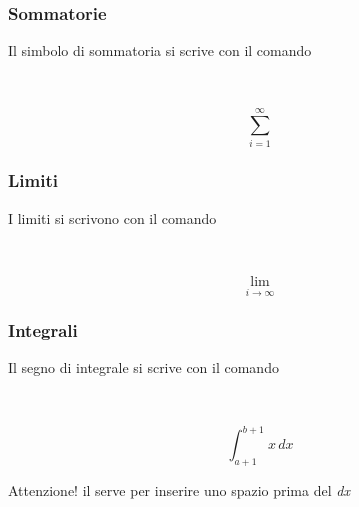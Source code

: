 \documentclass[svgnames,%
	ucs,%
	pdftex]{guitbeamer}
\begin{document}
\begin{frame}
  \frametitle{Sommatorie}
	Il simbolo di sommatoria si scrive con il comando 
 	\begin{LaTeXcode}
		\\[\n
		\hspace*{5ex}\alert{\\sum}\_\{i=1\}\textasciicircum \{\\infty\}\n
		\\]
 	\end{LaTeXcode}
	\begin{LaTeXoutput}
		\[
			\sum_{i=1}^{\infty}
		\]
	\end{LaTeXoutput}
\end{frame}
\begin{frame}
  \frametitle{Limiti}
	I limiti si scrivono con il comando 
 	\begin{LaTeXcode}
		\\[\n
		\hspace*{5ex}\alert{\\lim}\_\{i \\to \\infty\}\n
		\\]
 	\end{LaTeXcode}
	\begin{LaTeXoutput}
		\[
			\lim_{i \to \infty}
		\]
	\end{LaTeXoutput}
\end{frame}
\begin{frame}
  \frametitle{Integrali}
	Il segno di integrale si scrive con il comando \\
 	\begin{LaTeXcode}
		\\[\n
		\hspace*{5ex}\alert{\\int}\_\{a+1\}\textasciicircum \{b+1\}x\bs,dx\n
		\\]
 	\end{LaTeXcode}
	\begin{LaTeXoutput}
		\[
			\int_{a+1}^{b+1}x\,dx
		\]
	\end{LaTeXoutput}
	\begin{block}{Attenzione!}
	il \LCmd{,} serve per inserire uno spazio prima del \textrm{\textit{dx}}
	\end{block}
\end{frame}
\end{document}
